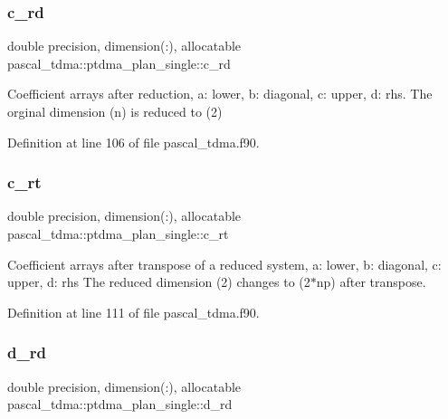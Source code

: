 \subsubsection{\texorpdfstring{c\_rd}{c\_rd}}
{\footnotesize\ttfamily double precision, dimension(\+:), allocatable pascal\+\_\+tdma\+::ptdma\+\_\+plan\+\_\+single\+::c\+\_\+rd}



Coefficient arrays after reduction, a\+: lower, b\+: diagonal, c\+: upper, d\+: rhs. The orginal dimension (n) is reduced to (2) 



Definition at line 106 of file pascal\+\_\+tdma.\+f90.

\mbox{\label{structpascal__tdma_1_1ptdma__plan__single_a7169b89281236696ea6eb5631ce44d95}} 
\subsubsection{\texorpdfstring{c\_rt}{c\_rt}}
{\footnotesize\ttfamily double precision, dimension(\+:), allocatable pascal\+\_\+tdma\+::ptdma\+\_\+plan\+\_\+single\+::c\+\_\+rt}



Coefficient arrays after transpose of a reduced system, a\+: lower, b\+: diagonal, c\+: upper, d\+: rhs The reduced dimension (2) changes to (2$\ast$np) after transpose. 



Definition at line 111 of file pascal\+\_\+tdma.\+f90.

\mbox{\label{structpascal__tdma_1_1ptdma__plan__single_a8b99edaa7ecd71fe6ceafd9c69d9a374}} 
\subsubsection{\texorpdfstring{d\_rd}{d\_rd}}
{\footnotesize\ttfamily double precision, dimension(\+:), allocatable pascal\+\_\+tdma\+::ptdma\+\_\+plan\+\_\+single\+::d\+\_\+rd}




